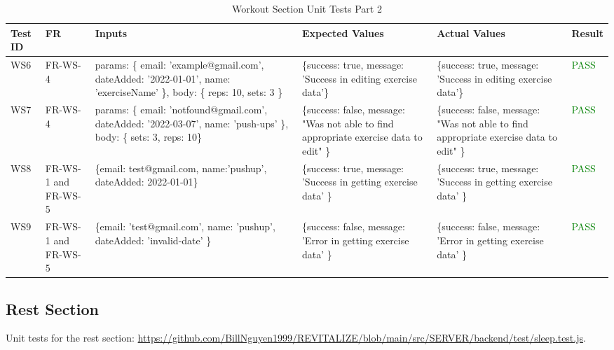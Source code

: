 \documentclass[12pt, titlepage]{article}
\begin{document}
\begin{table}[h]
\centering
\small
\begin{tabularx}{\textwidth}{|X|X|p{3cm}|p{2.5cm}|p{2.5cm}|X|}
	\hline
	Test ID & FR & Inputs & Expected Values & Actual Values & Result \\
	\hline
	WS6 & FR-WS-4 & params: \{ email: 'example@gmail.com', dateAdded: '2022-01-01', name: 'exerciseName' \},
	body: \{ reps: 10, sets: 3 \}  & \{success: true, message: 'Success in editing exercise data'\} & \{success: true, message: 'Success in editing exercise data'\} & \textcolor{Green}{PASS} \\
	\hline
	WS7 & FR-WS-4 & params: \{ email: 'notfound@gmail.com', dateAdded: '2022-03-07', name: 'push-ups' \},
	body: \{ sets: 3, reps: 10\}  & \{success: false, message: "Was not able to find appropriate exercise data to edit" \} & \{success: false, message: "Was not able to find appropriate exercise data to edit" \} & \textcolor{Green}{PASS} \\
	\hline
	WS8 & FR-WS-1 and FR-WS-5 & \{email: test@gmail.com, name:'pushup', dateAdded: 2022-01-01\}  & \{success: true,
	message: 'Success in getting exercise data' \} & \{success: true, message: 'Success in getting exercise data' \} & \textcolor{Green}{PASS} \\
	\hline
	WS9 & FR-WS-1 and FR-WS-5 & \{email: 'test@gmail.com', name: 'pushup', dateAdded: 'invalid-date' \} & \{success: false, message: 'Error in getting exercise data' \} & \{success: false, message: 'Error in getting exercise data' \} & \textcolor{Green}{PASS} \\
	\hline
\end{tabularx}
\caption{Workout Section Unit Tests Part 2}
\label{table:workout-unit-tests2}
\end{table}

\newpage

\subsection{Rest Section}

Unit tests for the rest section: \url{https://github.com/BillNguyen1999/REVITALIZE/blob/main/src/SERVER/backend/test/sleep.test.js}.
\end{document}

